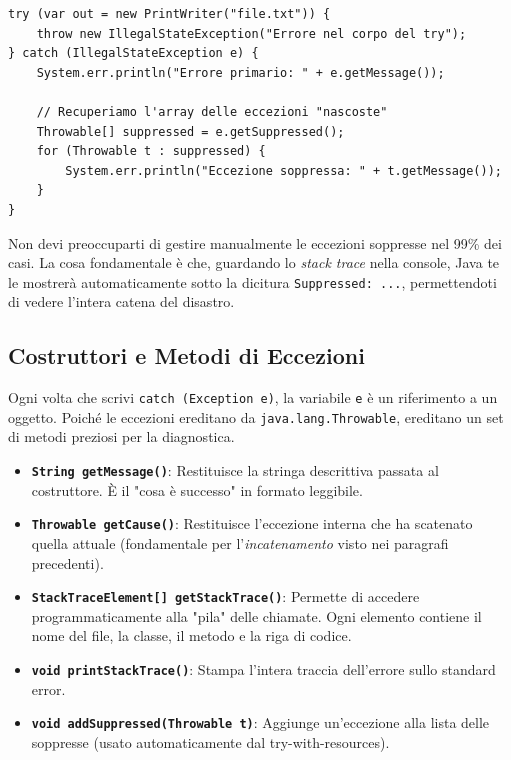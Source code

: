 \begin{lstlisting}[caption={Recupero delle eccezioni soppresse}]
try (var out = new PrintWriter("file.txt")) {
    throw new IllegalStateException("Errore nel corpo del try");
} catch (IllegalStateException e) {
    System.err.println("Errore primario: " + e.getMessage());
    
    // Recuperiamo l'array delle eccezioni "nascoste"
    Throwable[] suppressed = e.getSuppressed();
    for (Throwable t : suppressed) {
        System.err.println("Eccezione soppressa: " + t.getMessage());
    }
}
\end{lstlisting}

\begin{tip}
Non devi preoccuparti di gestire manualmente le eccezioni soppresse nel 99\% dei casi. La cosa fondamentale è che, guardando lo \textit{stack trace} nella console, Java te le mostrerà automaticamente sotto la dicitura \texttt{Suppressed: ...}, permettendoti di vedere l'intera catena del disastro.
\end{tip}

\subsection{Costruttori e Metodi di Eccezioni}

Ogni volta che scrivi \texttt{catch (Exception e)}, la variabile \texttt{e} è un riferimento a un oggetto. Poiché le eccezioni ereditano da \texttt{java.lang.Throwable}, ereditano un set di metodi preziosi per la diagnostica.

\begin{itemize}
    \item \textbf{\texttt{String getMessage()}}: Restituisce la stringa descrittiva passata al costruttore. È il "cosa è successo" in formato leggibile.
    \item \textbf{\texttt{Throwable getCause()}}: Restituisce l'eccezione interna che ha scatenato quella attuale (fondamentale per l'\textit{incatenamento} visto nei paragrafi precedenti).
    \item \textbf{\texttt{StackTraceElement[] getStackTrace()}}: Permette di accedere programmaticamente alla "pila" delle chiamate. Ogni elemento contiene il nome del file, la classe, il metodo e la riga di codice.
    \item \textbf{\texttt{void printStackTrace()}}: Stampa l'intera traccia dell'errore sullo standard error.
    \item \textbf{\texttt{void addSuppressed(Throwable t)}}: Aggiunge un'eccezione alla lista delle soppresse (usato automaticamente dal try-with-resources).
\end{itemize}
\vspace{\baselineskip}

